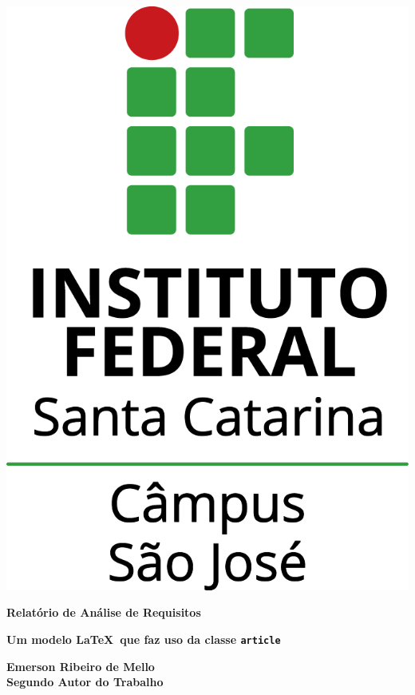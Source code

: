 \documentclass[11pt]{classes/ifscarticle}
\begin{document}
\begin{center}

\includegraphics[scale=.7]{classes/imagens/ifsc-v}
\vspace{7.5cm}

{\huge \bfseries Relatório de Análise de Requisitos}

\vspace{.5cm}

{\large \bfseries Um modelo \LaTeX~que faz uso da classe \texttt{article}}

\vfill
\end{center}

{\noindent \large \bfseries 
Emerson Ribeiro de Mello%
\\[.5em] Segundo Autor do Trabalho%
}
\end{document}
